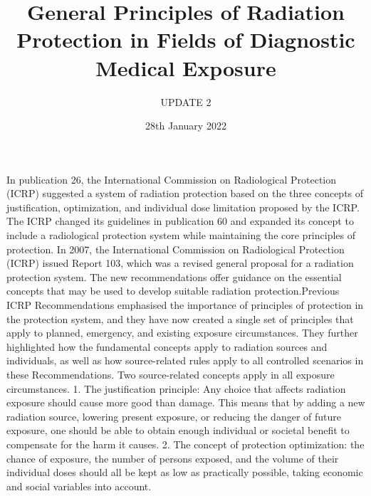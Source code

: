 \documentclass[12pt]{article}
\title{ General Principles of Radiation Protection in Fields of Diagnostic Medical Exposure}
\author{UPDATE 2}
\date{28th January 2022}
\begin{document}
\maketitle
In publication 26, the International Commission on Radiological Protection (ICRP) suggested a system of radiation protection based on the three concepts of justification, optimization, and individual dose limitation proposed by the ICRP. The ICRP changed its guidelines in publication 60 and expanded its concept to include a radiological protection system while maintaining the core principles of protection. In 2007, the International Commission on Radiological Protection (ICRP) issued Report 103, which was a revised general proposal for a radiation protection system. The new recommendations offer guidance on the essential concepts that may be used to develop suitable radiation protection.Previous ICRP Recommendations emphasised the importance of principles of protection in the protection system, and they have now created a single set of principles that apply to planned, emergency, and existing exposure circumstances. They further highlighted how the fundamental concepts apply to radiation sources and individuals, as well as how source-related rules apply to all controlled scenarios in these Recommendations.
Two source-related concepts apply in all exposure circumstances.
1. The justification principle: Any choice that affects radiation exposure should cause more good than damage. This means that by adding a new radiation source, lowering present exposure, or reducing the danger of future exposure, one should be able to obtain enough individual or societal benefit to compensate for the harm it causes.
2. The concept of protection optimization: the chance of exposure, the number of persons exposed, and the volume of their individual doses should all be kept as low as practically possible, taking economic and social variables into account.
\end{document}
